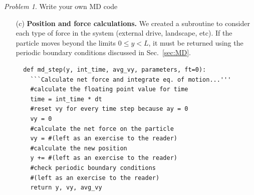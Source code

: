 \documentclass[preprint,showpacs,preprintnumbers,amsmath,amssymb,aps,prb]{revtex4-1}
\theoremstyle{remark}
\newtheorem{problem}{Problem}
\begin{document}
\begin{problem}{Write your own MD code}
\begin{enumerate}
 \qquad Add a {\tt for} loop
     to step through each integer time step.
     This loop 
     controls
     the flow of the program
     and retains information for the particle position and other
     properties
     as a function of time.
     Assume this information
     will be calculated in a subroutine.
        
\qquad We used the subroutine {\tt single\_particle()}
     to calculate the  lengths of the arrays that contain the 
     position, velocity, and time data.
     The lengths of these arrays are  affected by
     how much data you choose to save
     (see comment following sample code).
     Define a loop to 
     calculate the particle position and velocity through each
       time step,
     calculated in the subroutine {\tt md\_step()}
     which will be described in more detail in (c).
\begin{verbatim}
def single_particle(parameters,plot="y-position"):
    ```Run MD simulation...'''    
    #define empty arrays to hold data as a function of time
    #(left as an exercise to the reader)   
    #loop through the integer time steps in the simulation
    for int_time in range(0,maxtime):
        #(left as an exercise to the reader)
        time += dt
\end{verbatim}

{\it Comment:}     
     A key decision for any MD algorithm
     is how much information to save during and after
     the simulation.
     We define the following constants
     to manage the length of arrays
     containing data.
     We found in practice that for 
     short simulations times
     we could save all the data.
\begin{verbatim}
dict[`maxtime']=int(40/dict['freq'])   #total time steps 
dict[`writemovietime']=1   #write data to arrays for plotting
\end{verbatim}

\item[(c)] {\bf Position and force calculations.}
  We created a subroutine to consider each
  type of force in the system (external drive, landscape, etc).
  If the particle moves beyond the limits
  $0 \le y < L$,
  it must be returned 
  using the   periodic boundary conditions discussed
  in Sec.~\ref{sec:MD}.
\begin{verbatim}
  def md_step(y, int_time, avg_vy, parameters, ft=0):
    ```Calculate net force and integrate eq. of motion...'''
    #calculate the floating point value for time
    time = int_time * dt
    #reset vy for every time step because ay = 0 
    vy = 0 
    #calculate the net force on the particle
    vy = #(left as an exercise to the reader)
    #calculate the new position
    y += #(left as an exercise to the reader)
    #check periodic boundary conditions
    #(left as an exercise to the reader)
    return y, vy, avg_vy
\end{verbatim}


\end{enumerate}
\end{problem}
\end{document}
